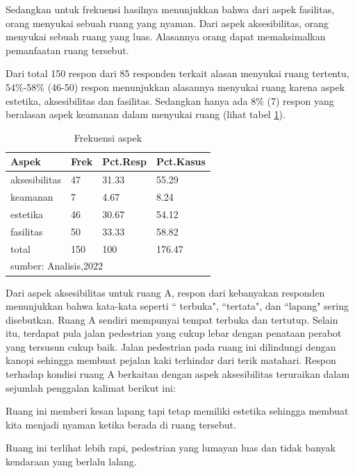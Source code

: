 \documentclass[11pt]{udthesis} %
\begin{document}
Sedangkan untuk frekuensi hasilnya menunjukkan bahwa dari aspek fasilitas, orang menyukai sebuah ruang yang nyaman. Dari aspek aksesibilitas, orang menyukai sebuah ruang yang luas. Alasannya orang dapat memaksimalkan pemanfaatan ruang tersebut.

Dari total 150 respon dari 85 responden terkait alasan menyukai ruang tertentu, 54\%-58\% (46-50) respon menunjukkan alasannya menyukai ruang karena aspek estetika, aksesibilitas dan fasilitas. Sedangkan hanya ada 8\% (7) respon yang beralasan aspek keamanan dalam menyukai ruang (lihat tabel \ref{tab:mrpaF}).

\begin{table}[ht]
\centering
\caption{Frekuensi aspek} 
\label{tab:mrpaF}
\begin{tabular}{llll}
  \toprule
Aspek & Frek & Pct.Resp & Pct.Kasus \\ 
  \midrule
aksesibilitas & 47 & 31.33 & 55.29 \\ 
  keamanan & 7 & 4.67 & 8.24 \\ 
  estetika & 46 & 30.67 & 54.12 \\ 
  fasilitas & 50 & 33.33 & 58.82 \\ 
  total & 150 & 100 & 176.47 \\ 
   \hline 
 \multicolumn{4}{l}{\scriptsize{sumber: Analisis,2022 }} \\
\end{tabular}
\end{table}

Dari aspek aksesibilitas untuk ruang A, respon dari kebanyakan responden menunjukkan bahwa kata-kata seperti `` terbuka", ``tertata", dan ``lapang" sering disebutkan. Ruang A sendiri mempunyai tempat terbuka dan tertutup. Selain itu, terdapat pula jalan pedestrian yang cukup lebar dengan penataan perabot yang tersusun cukup baik. Jalan pedestrian pada ruang ini dilindungi dengan kanopi sehingga membuat pejalan kaki terhindar dari terik matahari. Respon terhadap kondisi ruang A berkaitan dengan aspek aksesibilitas teruraikan dalam sejumlah penggalan kalimat berikut ini:

\begin{quoting}
    Ruang ini memberi kesan lapang tapi tetap memiliki estetika sehingga membuat kita menjadi nyaman ketika berada di ruang tersebut.
\end{quoting}

\begin{quoting}
    Ruang ini terlihat lebih rapi, pedestrian yang lumayan luas dan tidak banyak kendaraan yang berlalu lalang.
\end{quoting}
\end{document}
